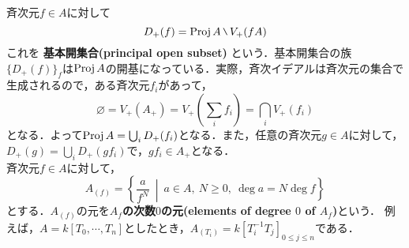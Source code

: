 斉次元$f\in A$に対して
\begin{equation*}
  D_{+}(f) = \proj{A}\mysetminus V_{+}(fA)
\end{equation*}
これを
\textbf{基本開集合(principal open subset)}
という．基本開集合の族$\{D_{+}(f)\}_{f}$は$\mathrm{Proj}\, A$の開基になっている．実際，斉次イデアルは斉次元の集合で生成されるので，ある斉次元$f_{i}$があって，
\begin{equation*}
  \varnothing = V_{+}(A_{+}) = V_{+}(\sum_{i}f_{i}) = \bigcap_{i}V_{+}(f_{i})
\end{equation*}
となる．よって$\mathrm{Proj}\, A = \bigcup_{i}D_{+}(f_{i})$となる．また，任意の斉次元$g\in A$に対して，$D_{+}(g) = \bigcup_{i}D_{+}(gf_{i})$で，$gf_{i} \in A_{+}$となる．\\
斉次元$f\in A$に対して，
\begin{equation*}
  A_{(f)} = \left\{ \frac{a}{f^{N}}\ \middle\vert \ a\in A,\ N\geq 0,\ \deg{a} = N\deg{f} \right\}
\end{equation*}
とする．$A_{(f)}$の元を\textbf{$A_{f}$の次数$0$の元(elements of degree $0$ of $A_{f}$)}という．
例えば，$A = k[T_{0},\cdots,T_{n}]$としたとき，$A_{(T_{i})} = k[T_{i}^{-1}T_{j}]_{0\leq j\leq n}$である．

